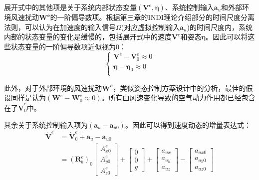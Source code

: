 展开式中的其他项是关于系统内部状态变量$(\boldsymbol{V}^e,\boldsymbol{\eta})$、系统控制输入$\boldsymbol{a}_{u}$和外部环境风速扰动$\boldsymbol{W^e}$的一阶偏导数项。根据第三章的INDI理论介绍部分的时间尺度分离法则，可以认为在加速度的输入信号$\Omega$(对应虚拟控制输入$\boldsymbol{a}_u$)的时间尺度内，系统内部的状态变量的变化是缓慢的，包括展开式中的速度$\boldsymbol{V}^e$和姿态$\boldsymbol{\eta}$。因此可以将这些状态变量的一阶偏导数项近似视为0：
\begin{equation}
    \begin{cases}
        \boldsymbol{V}^e-\boldsymbol{V}_0^e\approx0 \\
        \boldsymbol{\eta}-\boldsymbol{\eta}_0\approx0 \\
    \end{cases}
    \label{4_12}
\end{equation}

此外，对于外部环境的风速扰动$\boldsymbol{W^e}$，类似姿态控制方案设计中的分析，最佳的假设同样是认为$(\boldsymbol{W}^e-\boldsymbol{W}_0^e\approx0)$。所有由风速变化导致的空气动力作用都已经包含在了$\dot{\boldsymbol{V}}^e_0$中。

其余关于系统控制输入项为$(\boldsymbol{a}_{u}-\boldsymbol{a}_{u0})$。因此可以得到速度动态的增量表达式：
\begin{equation}
    \begin{aligned}
        \boldsymbol{\dot{V}}^e&=\boldsymbol{\dot{V}}^e_0+\boldsymbol{a}_{u}-\boldsymbol{a}_{u0}\\
        &=(\boldsymbol{R}_b^e)_0\begin{bmatrix}A_{x0}^e \\A_{y0}^e \\A_{z0}^e\end{bmatrix}+
        \begin{bmatrix}0 \\0 \\g\end{bmatrix}+
        \begin{bmatrix}a_{ux} \\a_{uy} \\a_{uz}\end{bmatrix}-
        \begin{bmatrix}a_{ux0} \\a_{uy0} \\a_{uz0}\end{bmatrix}
    \end{aligned}
    \label{4_13}
\end{equation}

